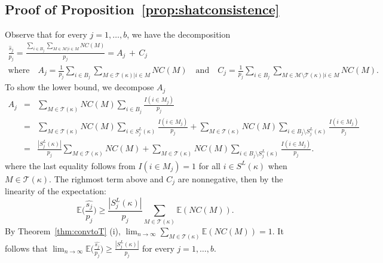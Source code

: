 \documentclass[bj,authoryear]{imsart}
\theoremstyle{plain}
\newcommand{\E}{\mathbb{E}}
\newcommand{\M}{\mathcal{M}}
\newcommand{\T}{\mathcal{T}}
\begin{document}
\subsection{Proof of Proposition~\ref{prop:shatconsistence}}
Observe that for every $j=1,\ldots,b$, we have the decomposition
\begin{gather}\label{eq:decompshat}
    \frac{\widehat{s}_j}{p_j}
    =\frac{\sum_{i \in B_j} \sum_{M \in \M | i \in M} NC(M)}{p_j}
   =A_j\,+\, C_j \\
       \text{where} \quad A_j=\frac{1}{p_j}\sum_{i \in B_j}\sum_{M \in \T(\kappa)|i\in M}NC(M) \quad\text{and}\quad  C_j=\frac{1}{p_j}\sum_{i \in B_j}\sum_{M \in \M\setminus \T(\kappa)|i\in M}NC(M). \nonumber
\end{gather}
To show the lower bound, we decompose $A_j$
\begin{eqnarray}
  A_j
   &=& \sum_{M \in \T(\kappa)}NC(M)\sum_{i \in B_j}\frac{I(i\in M_j)}{p_j}\nonumber\\
   &=& \sum_{M \in \T(\kappa)}NC(M)\sum_{i \in S^{L}_j(\kappa)}\frac{I(i\in M_j)}{p_j}+\sum_{M \in \T(\kappa)}NC(M)\sum_{i \in B_j\setminus S^{L}_j(\kappa)}\frac{I(i\in M_j)}{p_j}\nonumber\\
   &=& \frac{|S^{L}_j(\kappa)|}{p_j}\sum_{M \in \T(\kappa)}NC(M)+\sum_{M \in \T(\kappa)}NC(M)\sum_{i \in B_j\setminus S^{L}_j(\kappa)}\frac{I(i\in M_j)}{p_j}\label{eq:wigr}.
\end{eqnarray}
where the last equality follows from $I(i\in M_j)=1$ for all $i\in S^L(\kappa)$ when $M\in\T(\kappa)$. The righmost term above and $C_j$ are nonnegative, then by the linearity of the expectation:
$$\E\Big(\frac{\widehat{s_j}}{p_j}\Big)\geq\frac{|S^{L}_j(\kappa)|}{p_j}\sum_{M \in \T(\kappa)}\E(NC(M)).$$
By Theorem~\ref{thm:convtoT} (i), $\lim_{n\to\infty}\sum_{M \in \T(\kappa)}\E(NC(M))=1$. It follows that $\lim_{n\to\infty}\E\Big(\frac{\widehat{s_j}}{p_j}\Big)\geq \frac{|S^{L}_j(\kappa)|}{p_j}$ for every $j=1,\ldots,b$.
\end{document}
